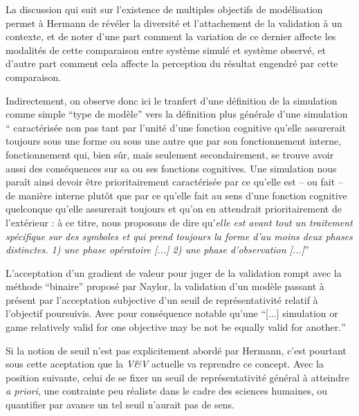 La discussion qui suit sur l'existence de multiples objectifs de modélisation permet à Hermann de révéler la diversité et l'attachement de la validation à un contexte, et de noter d'une part comment la variation de ce dernier affecte les modalités de cette comparaison entre système simulé et système observé, et d'autre part comment cela affecte la perception du résultat engendré par cette comparaison.

Indirectement, on observe donc ici le tranfert d'une définition de la simulation comme simple \enquote{type de modèle} vers la définition plus générale d'une simulation \enquote{ caractérisée non pas tant par l’unité d’une fonction cognitive qu’elle assurerait toujours sous une forme ou sous une autre que par son fonctionnement interne, fonctionnement qui, bien sûr, mais seulement secondairement, se trouve avoir aussi des conséquences sur sa ou ses fonctions cognitives. Une simulation nous paraît ainsi devoir être prioritairement caractérisée par ce qu’elle est – ou fait – de manière interne plutôt que par ce qu’elle fait au sens d’une fonction cognitive quelconque qu’elle assurerait toujours et qu’on en attendrait prioritairement de l’extérieur : à ce titre, nous proposons de dire qu’\textit{elle est avant tout un traitement spécifique sur des symboles et qui prend toujours la forme d'au moins deux phases distinctes. 1) une phase opératoire [...] 2) une phase d'observation [...]}} \autocite[33-34]{Varenne2013}


L'acceptation d'un gradient de valeur pour juger de la validation rompt avec la méthode \enquote{binaire} proposé par Naylor, la validation d'un modèle passant à présent par l'acceptation subjective d'un seuil de représentativité relatif à l'objectif poursuivis. Avec pour conséquence notable qu'une \foreignquote{english}{[...] simulation or game relatively valid for one objective may be not be equally valid for another.}

Si la notion de seuil n'est pas explicitement abordé par Hermann, c'est pourtant sous cette aceptation que la \textit{V\&V} actuelle va reprendre ce concept. Avec la position suivante, celui de se fixer un seuil de représentativité général à atteindre \textit{a priori}, une contrainte peu réaliste dans le cadre des sciences humaines, ou quantifier par avance un tel seuil n'aurait pas de sens. 

